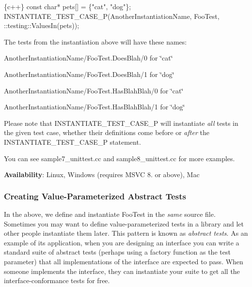 \begin{DoxyCode}
\{c++\}
const char* pets[] = \{"cat", "dog"\};
INSTANTIATE\_TEST\_CASE\_P(AnotherInstantiationName, FooTest,
                        ::testing::ValuesIn(pets));
\end{DoxyCode}


The tests from the instantiation above will have these names\+:


\begin{DoxyItemize}
\item {\ttfamily Another\+Instantiation\+Name/\+Foo\+Test.\+Does\+Blah/0} for {\ttfamily \char`\"{}cat\char`\"{}}
\item {\ttfamily Another\+Instantiation\+Name/\+Foo\+Test.\+Does\+Blah/1} for {\ttfamily \char`\"{}dog\char`\"{}}
\item {\ttfamily Another\+Instantiation\+Name/\+Foo\+Test.\+Has\+Blah\+Blah/0} for {\ttfamily \char`\"{}cat\char`\"{}}
\item {\ttfamily Another\+Instantiation\+Name/\+Foo\+Test.\+Has\+Blah\+Blah/1} for {\ttfamily \char`\"{}dog\char`\"{}}
\end{DoxyItemize}

Please note that {\ttfamily I\+N\+S\+T\+A\+N\+T\+I\+A\+T\+E\+\_\+\+T\+E\+S\+T\+\_\+\+C\+A\+S\+E\+\_\+P} will instantiate {\itshape all} tests in the given test case, whether their definitions come before or {\itshape after} the {\ttfamily I\+N\+S\+T\+A\+N\+T\+I\+A\+T\+E\+\_\+\+T\+E\+S\+T\+\_\+\+C\+A\+S\+E\+\_\+P} statement.

You can see sample7\+\_\+unittest.\+cc and sample8\+\_\+unittest.\+cc for more examples.

{\bfseries Availability}\+: Linux, Windows (requires M\+S\+VC 8. or above), Mac

\subsubsection*{Creating Value-\/\+Parameterized Abstract Tests}

In the above, we define and instantiate {\ttfamily Foo\+Test} in the {\itshape same} source file. Sometimes you may want to define value-\/parameterized tests in a library and let other people instantiate them later. This pattern is known as {\itshape abstract tests}. As an example of its application, when you are designing an interface you can write a standard suite of abstract tests (perhaps using a factory function as the test parameter) that all implementations of the interface are expected to pass. When someone implements the interface, they can instantiate your suite to get all the interface-\/conformance tests for free.


